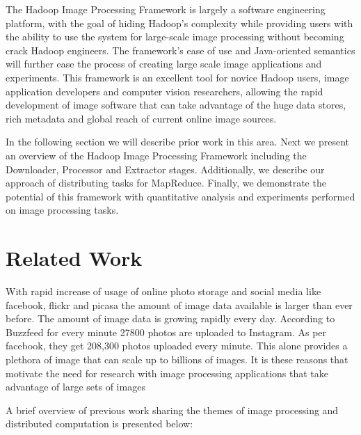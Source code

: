\documentclass[conference]{IEEEtran}
\begin{document}
	The Hadoop Image Processing Framework is largely a software engineering platform, with the goal of hiding Hadoop's complexity while providing users with the ability to use the system for large-scale image processing without becoming crack Hadoop engineers.  The framework's ease of use and Java-oriented semantics will further ease the process of creating large scale image applications and experiments. This framework is an excellent tool for novice Hadoop users, image application developers and computer vision researchers, allowing the rapid development of image software that can take advantage of the huge data stores, rich metadata and global reach of current online image sources.
	
	In the following section  we will describe prior work in this area. Next we present an overview of the Hadoop Image Processing Framework including the Downloader, Processor and Extractor stages. Additionally, we describe our approach of distributing tasks for MapReduce. Finally, we demonstrate the potential of this framework with quantitative analysis and experiments performed on image processing tasks.
	
	\section{Related Work}
	With rapid increase of usage of online photo storage and social media like facebook, flickr and picasa the amount of image data available is larger than ever before. The amount of image data is growing rapidly every day. According to Buzzfeed for every minute 27800 photos are uploaded to Instagram. As per facebook, they get 208,300 photos uploaded every minute\cite{Horaczek2013}. This alone provides a plethora of image that can scale up to billions of images. It is these reasons that motivate the need for research with image processing applications that take advantage of large sets of images
	
	A brief overview of previous work sharing the themes of image processing and distributed computation is presented below:
	
\end{document}
